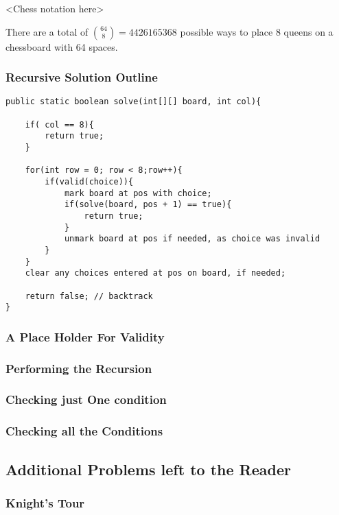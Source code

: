 <Chess notation here>

There are a total of $\binom{64}{8} = 4426165368$
possible ways to place 8 queens on a chessboard with 64 spaces.

\subsubsection{Recursive Solution Outline}
\begin{verbatim}
public static boolean solve(int[][] board, int col){
	
	if( col == 8){
		return true;
	}
	
	for(int row = 0; row < 8;row++){
		if(valid(choice)){
			mark board at pos with choice;
			if(solve(board, pos + 1) == true){
				return true;
			}
			unmark board at pos if needed, as choice was invalid
		}
	}
	clear any choices entered at pos on board, if needed;
	
	return false; // backtrack
}

\end{verbatim}

\subsubsection{A Place Holder For Validity}

\subsubsection{Performing the Recursion}

\subsubsection{Checking just One condition}


\subsubsection{Checking all the Conditions}




\subsection{Additional Problems left to the Reader}

\subsubsection{Knight's Tour}

